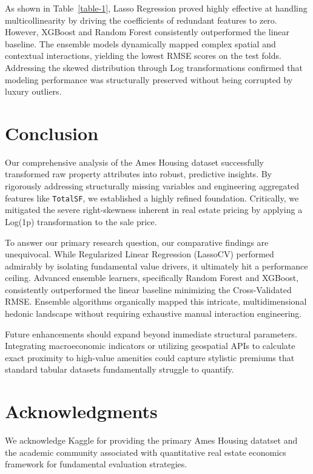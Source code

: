 \documentclass[eng]{ajceam-class}
\begin{document}
As shown in Table~\ref{table-1}, Lasso Regression proved highly effective at handling multicollinearity by driving the coefficients of redundant features to zero. However, XGBoost and Random Forest consistently outperformed the linear baseline. The ensemble models dynamically mapped complex spatial and contextual interactions, yielding the lowest RMSE scores on the test folds. Addressing the skewed distribution through Log transformations confirmed that modeling performance was structurally preserved without being corrupted by luxury outliers.

\section{Conclusion}

Our comprehensive analysis of the Ames Housing dataset successfully transformed raw property attributes into robust, predictive insights. By rigorously addressing structurally missing variables and engineering aggregated features like \texttt{TotalSF}, we established a highly refined foundation. Critically, we mitigated the severe right-skewness inherent in real estate pricing by applying a Log(1p) transformation to the sale price. 

To answer our primary research question, our comparative findings are unequivocal. While Regularized Linear Regression (LassoCV) performed admirably by isolating fundamental value drivers, it ultimately hit a performance ceiling. Advanced ensemble learners, specifically Random Forest and XGBoost, consistently outperformed the linear baseline minimizing the Cross-Validated RMSE. Ensemble algorithms organically mapped this intricate, multidimensional hedonic landscape without requiring exhaustive manual interaction engineering. 

Future enhancements should expand beyond immediate structural parameters. Integrating macroeconomic indicators or utilizing geospatial APIs to calculate exact proximity to high-value amenities could capture stylistic premiums that standard tabular datasets fundamentally struggle to quantify.

\section*{Acknowledgments}
We acknowledge Kaggle for providing the primary Ames Housing datatset and the academic community associated with quantitative real estate economics framework for fundamental evaluation strategies.



\end{document}
